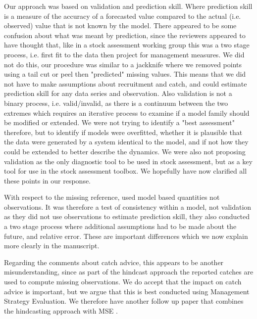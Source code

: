 Our approach was based on validation and prediction skill. Where prediction skill is a measure of the accuracy of a forecasted value compared to the actual (i.e. observed) value that is not known by the model. There appeared to be some confusion about what was meant by prediction, since the reviewers appeared to have thought that, like in a stock assessment working group this was a two stage process, i.e. first fit to the data then project for management measures. We did not do this, our procedure was similar to a jackknife where we removed points using a tail cut or peel then "predicted" missing values. This means that we did not have to make assumptions about recruitment and catch, and could estimate prediction skill for any data series and observation. Also validation is not a binary process, i.e. valid/invalid, as there is a continuum between the two extremes which requires an iterative process  to examine if a model family should be modified or extended. We were not trying to identify a "best assessment" therefore, but to identify if models were overfitted,  whether it is plausible that the data were generated by a system identical to the model, and if not how they could be extended to better describe the dynamics. We were also not proposing validation as the only diagnostic tool to be used in stock assessment, but as a key tool for use in the stock assessment toolbox. We hopefully have now clarified all these points in our response.

With respect to the missing reference, \cite{brooks2016retrospective} used model based quantities not observations. It was therefore a test of consistency within a model, not validation as they did not use observations to estimate prediction skill, they also conducted a two stage process where additional assumptions had to be made about the future, and relative error. These are important differences which we now explain more clearly in the manuscript.

Regarding the comments about catch advice, this appears to be another misunderstanding, since as part of the hindcast approach the reported catches are used to compute missing observations. We do accept that the impact on catch advice is important, but we argue that this is best conducted using Management Strategy Evaluation. We therefore have another follow up paper that combines the hindcasting approach with MSE \parencite[e.g.][]{pastoors2007validating}.

